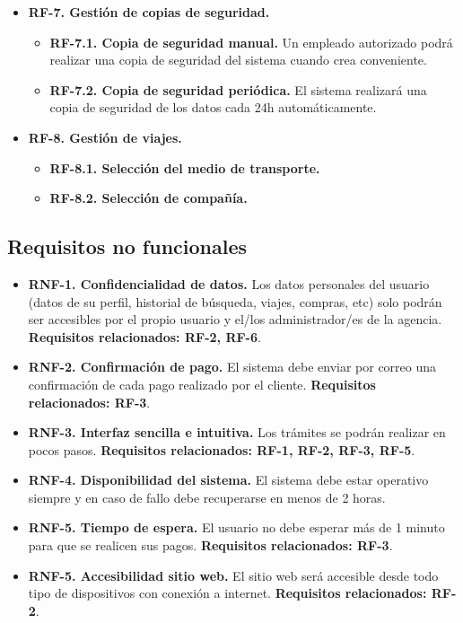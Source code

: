 \documentclass{article}
\begin{document}
\begin{itemize}
		\item {\bf RF-7. Gestión de copias de seguridad.}
		\begin{itemize}
			\item \textbf{RF-7.1. Copia de seguridad manual.} Un empleado autorizado podrá realizar una copia de seguridad del sistema cuando crea conveniente.
			\item \textbf{RF-7.2. Copia de seguridad periódica.} El sistema realizará una copia de seguridad de los datos cada 24h automáticamente.
		\end{itemize}
	
		\item \textbf{RF-8. Gestión de viajes.}
		\begin{itemize}
			\item \textbf{RF-8.1. Selección del medio de transporte.}
			\item \textbf{RF-8.2. Selección de compañía.}
		\end{itemize}
	\end{itemize}
	\subsection{Requisitos no funcionales}
	\begin{itemize}
		\item {\bf RNF-1. Confidencialidad de datos.} Los datos personales del usuario (datos de su perfil, historial de búsqueda, viajes, compras, etc) solo podrán ser accesibles por el propio usuario y el/los administrador/es de la agencia. \textbf{Requisitos relacionados: RF-2, RF-6}.
		\item {\bf RNF-2. Confirmación de pago.} El sistema debe enviar por correo una confirmación de cada pago realizado por el cliente. \textbf{Requisitos relacionados: RF-3}.
		\item \textbf{RNF-3. Interfaz sencilla e intuitiva.} Los trámites se podrán realizar en pocos pasos. \textbf{Requisitos relacionados: RF-1, RF-2, RF-3, RF-5}.
		\item \textbf{RNF-4. Disponibilidad del sistema.} El sistema debe estar operativo siempre y en caso de fallo debe recuperarse en menos de 2 horas.
		\item \textbf{RNF-5. Tiempo de espera.} El usuario no debe esperar más de 1 minuto para que se realicen sus pagos. \textbf{Requisitos relacionados: RF-3}.
		\item \textbf{RNF-5. Accesibilidad sitio web.} El sitio web será accesible desde todo tipo de dispositivos con conexión a internet. \textbf{Requisitos relacionados: RF-2}.
		
	\end{itemize}
\end{document}
